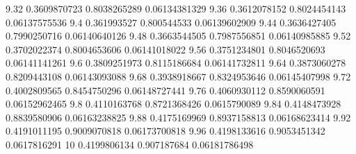 {9.32 0.3609870723 0.8038265289 0.06134381329
9.36 0.3612078152 0.8024454143 0.06137575536
9.4 0.361993527 0.800544533 0.06139602909
9.44 0.3636427405 0.7990250716 0.06140640126
9.48 0.3663544505 0.7987556851 0.06140985885
9.52 0.3702022374 0.8004653606 0.06141018022
9.56 0.3751234801 0.8046520693 0.06141141261
9.6 0.3809251973 0.8115186684 0.06141732811
9.64 0.3873060278 0.8209443108 0.06143093088
9.68 0.3938918667 0.8324953646 0.06145407998
9.72 0.4002809565 0.8454750296 0.06148727441
9.76 0.4060930112 0.8590060591 0.06152962465
9.8 0.4110163768 0.8721368426 0.0615790089
9.84 0.4148473928 0.8839580906 0.06163238825
9.88 0.4175169969 0.8937158813 0.06168623414
9.92 0.4191011195 0.9009070818 0.06173700818
9.96 0.4198133616 0.9053451342 0.0617816291
10 0.4199806134 0.907187684 0.06181786498
}\fittedevent
{}\fittedsweep
